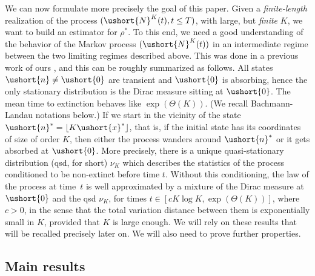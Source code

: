 \documentclass[10pt]{amsart}
\numberwithin{equation}{section}
\theoremstyle{plain}
\theoremstyle{definition}
\newcommand{\vecn}{\ushort{n}}
\newcommand{\vecnf}{\ushort{n}^*}
\newcommand{\vecxf}{\ushort{x}^*}
\newcommand{\veczer}{\ushort{0}}
\newcommand{\res}{\rho^*}
\newcommand{\leproc}{\ushort{N}^{K}}
\newcommand{\nuk}{\nu_{K}}\let\snuk\nuk
\begin{document}
We can now formulate more precisely the goal of this paper.
Given a \emph{finite-length} realization of the process $(\leproc(t), t\leq T)$, with large, but \emph{finite} $K$, we want to build an
estimator for $\res$.
To this end, we need a good understanding of the behavior of the Markov process $(\leproc(t))$ in an intermediate regime between the
two limiting regimes described above. This was done in a previous work of ours \cite{ccm2}, and this can be roughly summarized as follows.
All states $\vecn\neq \veczer$ are transient and $\veczer$ is absorbing, hence the only stationary distribution is the Dirac measure sitting at
$\veczer$. The mean time to extinction behaves like $\exp(\Theta(K))$. (We recall Bachmann-Landau notations below.)
If we start in the vicinity of the state $\vecnf = \lfloor K\vecxf\rfloor$, that is, if the initial state has its coordinates of size of order $K$,
then either the process wanders around $\vecnf$ or it gets absorbed at $\veczer$.
More precisely, there is a unique quasi-stationary distribution (qsd, for short) $\nuk$ which describes the statistics of the process conditioned
to be non-extinct before time $t$. Without this conditioning, the law of the process at time~$t$ is well approximated by a mixture of the
Dirac measure at $\veczer$ and the qsd $\nuk$, for times $t\in\left[c K\log K, \exp(\Theta(K))\right]$, where $c>0$, in the sense that the total variation
distance between them is exponentially small in $K$, provided that $K$ is large enough.
We will rely on these results that will be recalled precisely later on. We will also need to prove further properties.

\subsection{Main results}\label{subsec:main-results}
\end{document}
